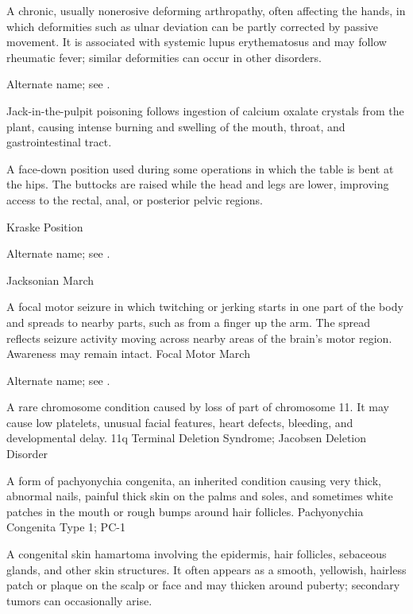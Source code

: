  A chronic, usually nonerosive deforming arthropathy, often affecting the hands, in which deformities such as ulnar deviation can be partly corrected by passive movement. It is associated with systemic lupus erythematosus and may follow rheumatic fever; similar deformities can occur in other disorders.

 Alternate name; see .

 Jack-in-the-pulpit poisoning follows ingestion of calcium oxalate crystals from the plant, causing intense burning and swelling of the mouth, throat, and gastrointestinal tract.

 A face-down position used during some operations in which the table is bent at the hips. The buttocks are raised while the head and legs are lower, improving access to the rectal, anal, or posterior pelvic regions.

\synonyms
Kraske Position

 Alternate name; see .

\synonyms
Jacksonian March

 A focal motor seizure in which twitching or jerking starts in one part of the body and spreads to nearby parts, such as from a finger up the arm. The spread reflects seizure activity moving across nearby areas of the brain's motor region. Awareness may remain intact.
\synonyms
Focal Motor March

 Alternate name; see .

 A rare chromosome condition caused by loss of part of chromosome 11. It may cause low platelets, unusual facial features, heart defects, bleeding, and developmental delay.
\synonyms
11q Terminal Deletion Syndrome; Jacobsen Deletion Disorder

 A form of pachyonychia congenita, an inherited condition causing very thick, abnormal nails, painful thick skin on the palms and soles, and sometimes white patches in the mouth or rough bumps around hair follicles.
\synonyms
Pachyonychia Congenita Type 1; PC-1

 A congenital skin hamartoma involving the epidermis, hair follicles, sebaceous glands, and other skin structures. It often appears as a smooth, yellowish, hairless patch or plaque on the scalp or face and may thicken around puberty; secondary tumors can occasionally arise.

